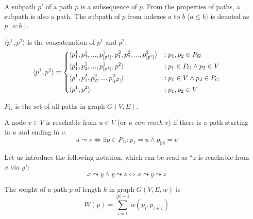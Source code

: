 \begin{definition}[Subpath]
    A subpath $p'$ of a path $p$ is a subsequence of $p$. From the properties of paths, a subpath is also a path. The subpath of $p$ from indexes $a$ to $b$ ($a \leq b)$ is denoted as $p[a:b]$.
\end{definition}
\begin{definition}
    $\langle p^1, p^2 \rangle$ is the concatenation of $p^1$ and $p^2$.
    \begin{equation*}
        \langle p^1, p^2 \rangle = \begin{dcases}
            \langle p^1_1, p^1_2,...,p^1_{|p^1|}, p^2_1,p^2_2,...,p^2_{|p^2|} \rangle & : p_1,p_2 \in P_G \\
            \langle p^1_1, p^1_2,...,p^1_{|p^1|}, p^2                         \rangle & : p_1 \in P_G \wedge p_2 \in V \\
            \langle p^1, p^2_1, p^2_2,..., p^2_{|p^2|}                        \rangle & : p_1 \in V \wedge p_2 \in P_G \\
            \langle p^1, p^2                                                  \rangle & : p_1,p_2 \in V \\
        \end{dcases}
    \end{equation*}
\end{definition}
\begin{definition}
    $P_G$ is the set of all paths in graph $G(V,E)$.
\end{definition}
\begin{definition}[Reachability]
    A node $v \in V$ is reachable from $u \in V$ (or \emph{$u$ can reach $v$}) if there is a path starting in $u$ and ending in $v$.
    \begin{equation*}
        u \leadsto v \iff \exists p \in P_G \colon p_1 = u \wedge p_{|p|} = v
    \end{equation*}
\end{definition}
Let us introduce the following notation, which can be read as ``$z$ is reachable from $x$ via $y$":
\begin{equation*}
    x \leadsto y \wedge y \leadsto z \iff x \leadsto y \leadsto z
\end{equation*}
\begin{definition}
    The weight of a path $p$ of length $k$ in graph $G(V,E,w)$ is
    \begin{equation*}
        W(p) = \sum_{i=1}^{|p|-1}{w(p_i, p_{i+1})}
    \end{equation*}
\end{definition}
